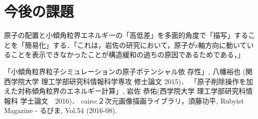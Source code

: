 \documentclass[a4j,twocolumn]{jsarticle}
\begin{document}
\section{今後の課題}
原子の配置と小傾角粒界エネルギーの「高低差」を多面的角度で「描写」することを「簡易化」する．「これは，岩佐の研究において，原子がz軸方向に動いていることを表示できなかったことが構造緩和の過ちの原因であるためである，」

\begin{thebibliography}{9}
 「小傾角粒界粒子シミュレーションの原子ポテンシャル依 存性」, 八幡裕也 (関西学院大学 理工学部研究科情報科学専攻 修士論文 2015)．
 「原子削除操作を加えた対称傾角粒界のエネルギー計算」, 岩佐 恭佑(西学院大学 理工学部研究科情報科 学士論文　2016)． 
 cairo:２次元画像描画ライブラリ，須藤功平, Rubyist Magazine - るびま, Vol.54 (2016-08).
\end{thebibliography}
\end{document}

